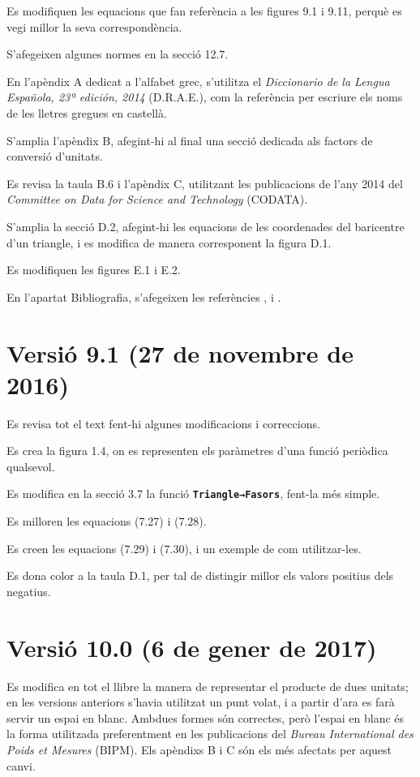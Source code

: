Es modifiquen les equacions que fan referència a les figures 9.1 i 9.11, perquè es vegi millor la seva correspondència.

S'afegeixen algunes normes en la secció 12.7.

En l'apèndix A dedicat a l'alfabet grec, s'utilitza el  
\textit{Diccionario de la Lengua Española, 23ª
edición, 2014} (D.R.A.E.), com la referència per escriure els noms de les lletres gregues en castellà.

S'amplia l'apèndix B, afegint-hi al final una secció dedicada als factors de conversió d'unitats.

Es revisa la taula B.6 i l'apèndix C, utilitzant les publicacions de l'any 2014 del \textit{Committee on Data for Science and Technology} (CODATA).


S'amplia la secció D.2, afegint-hi les equacions de les coordenades del baricentre d'un triangle, i es modifica de manera corresponent la figura D.1.

Es modifiquen les figures E.1 i E.2.

En l'apartat Bibliografia, s'afegeixen les referències \cite{VOS}, \cite{WMF} i \cite{TRA}.


\section*{Versió 9.1 (27 de novembre de 2016)}

Es revisa tot el text fent-hi algunes  modificacions i correccions.

Es crea la figura 1.4, on es representen els paràmetres d'una funció periòdica qualsevol.

Es modifica en la secció 3.7 la funció \texttt{\textbf{Triangle→Fasors}}, fent-la més simple.

Es milloren les equacions (7.27) i (7.28).

Es creen les equacions (7.29) i (7.30), i un exemple de com utilitzar-les.

Es dona color a la taula D.1, per tal de distingir millor els valors positius dels negatius.

\section*{Versió 10.0 (6 de gener de 2017)}

Es modifica en tot el llibre la manera de representar el producte de dues unitats; en les versions anteriors s'havia utilitzat un punt volat, i a partir d'ara es farà servir un espai en blanc. Ambdues formes són correctes, però l'espai en blanc és la forma utilitzada preferentment en les publicacions del  \textit{Bureau International des Poids et Mesures} (BIPM). Els apèndixs B i C són els més afectats per aquest canvi.

